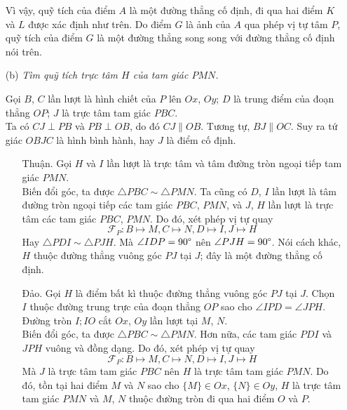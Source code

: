 \begin{solution}
\begin{enumerate}
                Vì vậy, quỹ tích của điểm \(A\) là một đường thẳng cố định, đi qua hai điểm \(K\) và \(L\) được xác định như trên. Do điểm \(G\) là ảnh của \(A\) qua phép vị tự tâm \(P\), quỹ tích của điểm \(G\) là một đường thẳng song song với đường thẳng cố định nói trên.

                \item[(b)] \textit{Tìm quỹ tích trực tâm \(H\) của tam giác \(PMN\).}

                Gọi \(B\), \(C\) lần lượt là hình chiết của \(P\) lên \(Ox\), \(Oy\); \(D\) là trung điểm của đoạn thẳng \(OP\); \(J\) là trực tâm tam giác \(PBC\).\\
                Ta có \(CJ \perp PB\) và \(PB \perp OB\), do đó \(CJ \parallel OB\). Tương tự, \(BJ \parallel OC\). Suy ra tứ giác \(OBJC\) là hình bình hành, hay \(J\) là điểm cố định.

                \begin{enumerate}[leftmargin=1.25cm]
                
                    \item[Thuận.] Gọi \(H\) và \(I\) lần lượt là trực tâm và tâm đường tròn ngoại tiếp tam giác \(PMN\).\\
                    Biến đổi góc, ta được \(\triangle PBC \sim \triangle PMN\). Ta cũng có \(D\), \(I\) lần lượt là tâm đường tròn ngoại tiếp các tam giác \(PBC\), \(PMN\), và \(J\), \(H\) lần lượt là trực tâm các tam giác \(PBC\), \(PMN\). Do đó, xét phép vị tự quay
                    \[\mathcal{F}_{P}: B \mapsto M, C \mapsto N, D \mapsto I, J \mapsto H\]
                    Hay \(\triangle PDI \sim \triangle PJH\). Mà \(\angle IDP = 90 \degree\) nên \(\angle PJH = 90 \degree\). Nói cách khác, \(H\) thuộc đường thẳng vuông góc \(PJ\) tại \(J\); đây là một đường thẳng cố định.

                    \item[Đảo.] Gọi \(H\) là điểm bất kì thuộc đường thẳng vuông góc \(PJ\) tại \(J\). Chọn \(I\) thuộc đường trung trực của đoạn thẳng \(OP\) sao cho \(\angle IPD = \angle JPH\). Đường tròn \(I;IO\) cắt \(Ox\), \(Oy\) lần lượt tại \(M\), \(N\).\\
                    Biến đổi góc, ta được \(\triangle PBC \sim \triangle PMN\). Hơn nữa, các tam giác \(PDI\) và \(JPH\) vuông và đồng dạng. Do đó, xét phép vị tự quay
                    \[\mathcal{F}_{P}: B \mapsto M, C \mapsto N, D \mapsto I, J \mapsto H\]
                    Mà \(J\) là trực tâm tam giác \(PBC\) nên \(H\) là trực tâm tam giác \(PMN\). Do đó, tồn tại hai điểm \(M\) và \(N\) sao cho \(\{M\} \in Ox\), \(\{N\} \in Oy\), \(H\) là trực tâm tam giác \(PMN\) và \(M\), \(N\) thuộc đường tròn đi qua hai điểm \(O\) và \(P\).
                

\end{enumerate}
\end{enumerate}
\end{solution}
